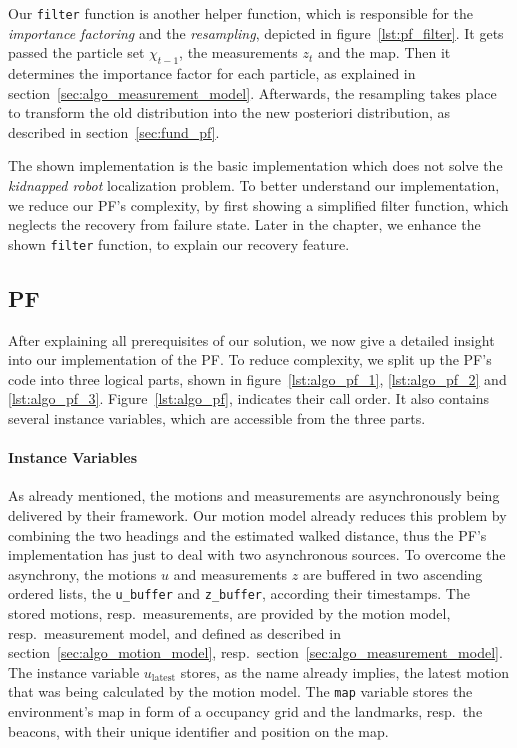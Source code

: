 Our \texttt{filter} function is another helper function, which is responsible for the \emph{importance factoring} and the \emph{resampling}, depicted in figure~\ref{lst:pf_filter}. It gets passed the particle set $\chi_{t-1}$, the measurements $z_t$ and the map. Then it determines the importance factor for each particle, as explained in section~\ref{sec:algo_measurement_model}. Afterwards, the resampling takes place to transform the old distribution into the new posteriori distribution, as described in section~\ref{sec:fund_pf}.

 The shown implementation is the basic implementation which does not solve the \emph{kidnapped robot} localization problem. To better understand our implementation, we reduce our \acs{PF}'s complexity, by first showing a simplified filter function, which neglects the recovery from failure state. Later in the chapter, we enhance the shown \texttt{filter} function, to explain our recovery feature. 

\subsection{\acl{PF}}
After explaining all prerequisites of our solution, we now give a detailed insight into our implementation of the \acl{PF}. To reduce complexity, we split up the \acs{PF}'s code into three logical parts, shown in figure~\ref{lst:algo_pf_1}, \ref{lst:algo_pf_2} and \ref{lst:algo_pf_3}. Figure~\ref{lst:algo_pf}, indicates their call order. It also contains several instance variables, which are accessible from the three parts.


\paragraph{Instance Variables} As already mentioned, the motions and measurements are asynchronously being delivered by their framework. Our motion model already reduces this problem by combining the two headings and the estimated walked distance, thus the \acs{PF}'s implementation has just to deal with two asynchronous sources. To overcome the asynchrony, the motions $u$ and measurements $z$ are buffered in two ascending ordered lists, the \texttt{u\_buffer} and \texttt{z\_buffer}, according their timestamps. The stored motions, resp.\ measurements, are provided by the motion model, resp.\ measurement model, and defined as described in section~\ref{sec:algo_motion_model}, resp.\ section~\ref{sec:algo_measurement_model}. The instance variable $u_\text{latest}$ stores, as the name already implies, the latest motion that was being calculated by the motion model. The \texttt{map} variable stores the environment's map in form of a occupancy grid and the landmarks, resp.\ the beacons, with their unique identifier and position on the map.

